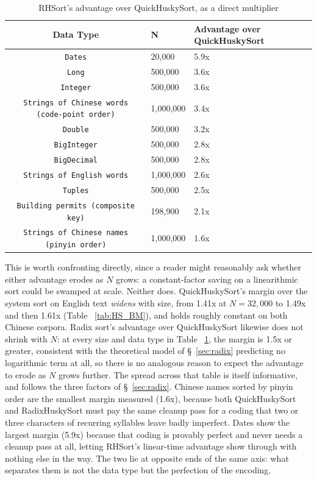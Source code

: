 \documentclass[twoside,leqno,twocolumn]{article}
\begin{document}
\begin{table}
  \caption{RHSort's advantage over QuickHuskySort, as a direct multiplier}
  \label{tab:RadixImprovements}
  \begin{tabular}{cll}
    \toprule
    Data Type & N & Advantage over QuickHuskySort \\
    \midrule
    \texttt{Dates} & 20,000 & 5.9x \\
    \texttt{Long} & 500,000 & 3.6x \\
    \texttt{Integer} & 500,000 & 3.6x \\
    \texttt{Strings of Chinese words (code-point order)} & 1,000,000 & 3.4x \\
    \texttt{Double} & 500,000 & 3.2x \\
    \texttt{BigInteger} & 500,000 & 2.8x \\
    \texttt{BigDecimal} & 500,000 & 2.8x \\
    \texttt{Strings of English words} & 1,000,000 & 2.6x \\
    \texttt{Tuples} & 500,000 & 2.5x \\
    \texttt{Building permits (composite key)} & 198,900 & 2.1x \\
    \texttt{Strings of Chinese names (pinyin order)} & 1,000,000 & 1.6x \\
    \bottomrule
  \end{tabular}
\end{table}

This is worth confronting directly, since a reader might reasonably ask whether either advantage erodes
as $N$ grows: a constant-factor saving on a linearithmic sort could be swamped at scale.
Neither does.
QuickHuskySort's margin over the system sort on English text \emph{widens} with size,
from 1.41x at $N=32{,}000$ to 1.49x and then 1.61x (Table ~\ref{tab:HS_BM}),
and holds roughly constant on both Chinese corpora.
Radix sort's advantage over QuickHuskySort likewise does not shrink with $N$:
at every size and data type in Table ~\ref{tab:RadixImprovements}, the margin is 1.5x or greater,
consistent with the theoretical model of \S~\ref{sec:radix} predicting no logarithmic term at all,
so there is no analogous reason to expect the advantage to erode as $N$ grows further.
The spread across that table is itself informative, and follows the three factors of \S~\ref{sec:radix}.
Chinese names sorted by pinyin order are the smallest margin measured (1.6x),
because both QuickHuskySort and RadixHuskySort must pay the same cleanup pass for a coding
that two or three characters of recurring syllables leave badly imperfect.
Dates show the largest margin (5.9x) because that coding is provably perfect and never needs a cleanup pass at all,
letting RHSort's linear-time advantage show through with nothing else in the way.
The two lie at opposite ends of the same axis: what separates them is not the data type but the perfection of the encoding.
\end{document}
